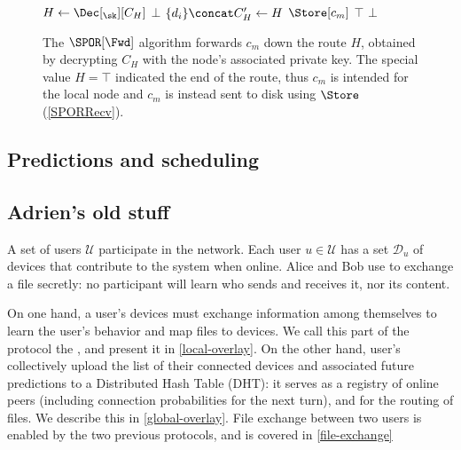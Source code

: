 \begin{figure}
  \begin{algorithmic}
      \State $H\gets \Dec[_\sk][C_H]$
        \State \Return $\bot$
      \EndIf
      \State $\{d_i\}\concat C_H'\gets H$
        \State \Return $\Store[c_m]$
      \EndIf
          \State \Return $\top$
        \EndIf
      \EndFor
      \State \Return $\bot$
    \EndFunction
  \end{algorithmic}
  \caption{\label{SPORFwd}%
    The \(\SPOR[\Fwd]\) algorithm forwards \(c_m\) down the route \(H\), 
    obtained by decrypting \(C_H\) with the node's associated private key.%
    The special value \(H = \top\) indicated the end of the route, thus \(c_m\) 
    is intended for the local node and \(c_m\) is instead sent to disk using 
    \(\Store\) (\cref{SPORRecv}).%
  }
\end{figure}

\subsection{Predictions and scheduling}




\subsection{Adrien's old stuff}

A set of users $\mathcal{U}$ participate in the \name network.
Each user $u \in \mathcal{U}$ has a set $\mathcal{D}_u$ of devices that contribute to the system when online.
Alice and Bob use \name to exchange a file secretly: no participant will learn who sends and receives it, nor its content.

On one hand, a user's devices must exchange information among themselves to learn the user's behavior  and map files to devices.
We call this part of the protocol the \localoverlay, and present it in 
\cref{local-overlay}. On the other hand, user's collectively upload the list of 
their connected devices and associated future predictions to a Distributed Hash 
Table (DHT): it serves as a registry of online peers (including connection 
probabilities for the next turn), and for the routing of files.
We describe this \globaloverlay in \cref{global-overlay}. File exchange between 
two users is enabled by the two previous protocols, and is covered in 
\cref{file-exchange}

